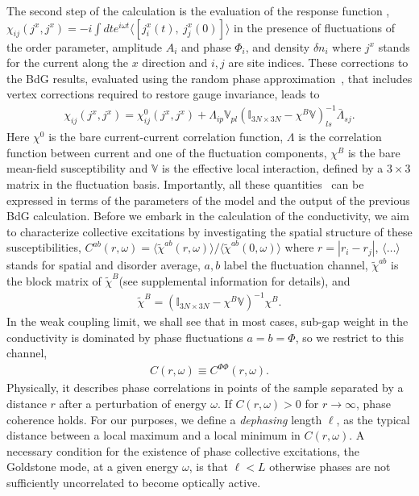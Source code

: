 \documentclass[Collective.tex]{revtex4-1}
\begin{document}
\indent The second step of the calculation is the evaluation of the response function \cite{cea2014},
%
$\chi_{ij}(j^x,j^x)=-i \int dt e^{i\omega t} \langle \left[j_i^x(t),\ j_j^x(0)\right] \rangle$
in the presence of fluctuations of the order parameter, amplitude $A_i$ and phase $\Phi_i$, and density $\delta n_i$ where $j^x$ stands for the current along the $x$ direction and $i,j$ are site indices. 
These corrections to the BdG results, evaluated using the random phase approximation~\cite{Supplementary,cea2014}, that includes vertex corrections required to restore gauge invariance, leads to 
\begin{align}
	\chi_{ij}\!\left(j^x,j^x\right) \!=\! \chi^0_{ij}\!\left(j^x,j^x\right) + \Lambda_{ip}\mathbb{V}_{pl} \left(\mathbb{I}_{3N\times 3N}\!-\!\chi^B \mathbb{V}\right)^{-1}_{ls}\bar{\Lambda}_{sj}.
	\label{eq.fullchi}
\end{align}
Here $\chi^0$ is the bare current-current correlation function, $\Lambda$ is the correlation function between current and one of the fluctuation components, $\chi^B$ is the bare mean-field susceptibility and $\mathbb{V}$ is the effective local interaction, defined by a $3 \times 3$ matrix in the fluctuation basis. Importantly,  all these quantities~\cite{Supplementary} can be expressed in terms of the parameters of the model and the output of the previous BdG calculation. 
Before we embark in the calculation of the conductivity, we aim to characterize collective excitations by investigating the spatial structure of these susceptibilities, $C^{ab}(r,\omega)=\langle\tilde{\chi}^{ab}(r,\omega)\rangle/\langle\tilde{\chi}^{ab}(0,\omega)\rangle$ where $r=|r_i-r_j|$, $\langle \ldots \rangle$ stands for spatial and disorder average, $a,b$ label the fluctuation channel, $\tilde\chi^{ab}$ is the block matrix of $\tilde{\chi}^B$(see supplemental information \cite{Supplementary} for details), and
\begin{align}
	\tilde{\chi}^B = \left(\mathbb{I}_{3N\times 3N}-\chi^B \mathbb{V}\right)^{-1}\chi^B. 
	\label{eq.RPA}
\end{align}
In the weak coupling limit, we shall see that in most cases, sub-gap weight in the conductivity is dominated by phase fluctuations $a=b=\Phi$, so we restrict to this channel,  
\begin{align}\label{cr}
	C(r,\omega) \equiv C^{\Phi\Phi}(r,\omega). 
\end{align}
Physically, it describes phase correlations in points of the sample separated by a distance $r$ after a perturbation of energy $\omega$. If $C(r,\omega)>0$ for $r \to \infty$, phase coherence holds. For our purposes, we define a {\it dephasing} length $\ell$, as the typical distance between a local maximum and a local minimum in $C(r,\omega)$. A necessary condition for the existence of phase collective excitations, the Goldstone mode, at a given energy $\omega$, is that $\ell < L$ otherwise phases are not sufficiently uncorrelated to become optically active.
\end{document}
